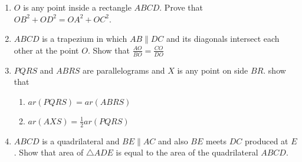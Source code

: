\begin{enumerate}[label=\thesubsection.\arabic*.,ref=\thesubsection.\theenumi]
%
\item $O$ is any point inside a rectangle $ABCD$. Prove that $OB^2+OD^2 = OA^2+OC^2$.
\item $ABCD$ is a trapezium in which $AB  \parallel  DC$ and its diagonals intersect each other at the point $O$. Show
that
$\frac{AO}{ BO}=\frac{CO}{  DO}$
%
\item $PQRS$ and $ABRS$ are parallelograms and $X$ is any point on side $BR$. show that 
\begin{enumerate} 
\item $ar (PQRS) = ar (ABRS)$
\item $ar (AX S) = \frac{1}{ 2} ar (PQRS)$
\end{enumerate}
\item $ABCD$ is a quadrilateral and $BE  \parallel  AC$ and also $BE$ meets $DC$ produced at $E$. Show that area of $ \triangle  ADE$ is equal to the area of the quadrilateral $ABCD$.
\end{enumerate}
